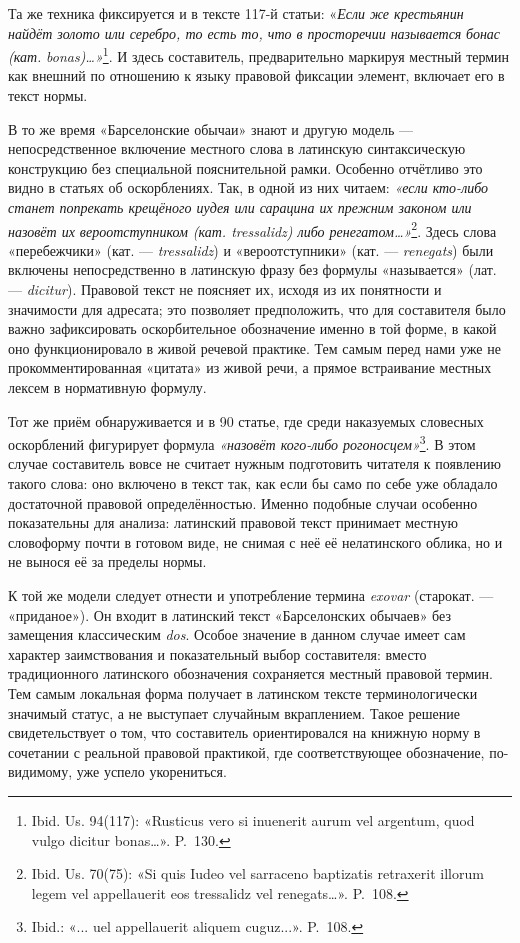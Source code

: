 Та же техника фиксируется и в тексте 117-й статьи: «\emph{Если же крестьянин найдёт золото или серебро, то есть то, что в просторечии называется }\emph{бонас (кат. }\emph{bonas}\emph{)}\emph{…»}\footnote{Ibid. Us. 94(117): «Rusticus vero si inuenerit aurum vel argentum, quod vulgo dicitur bonas…». P.~130.}. И здесь составитель, предварительно маркируя местный термин как внешний по отношению к языку правовой фиксации элемент, включает его в текст нормы.

В то же время «Барселонские обычаи» знают и другую модель --- непосредственное включение местного слова в латинскую синтаксическую конструкцию без специальной пояснительной рамки. Особенно отчётливо это видно в статьях об оскорблениях. Так, в одной из них читаем: \emph{«если кто-либо станет попрекать крещёного иудея или сарацина их прежним законом или назовёт их вероотступником (кат. tressalidz) либо ренегатом…»}\footnote{Ibid. Us. 70(75): «Si quis Iudeo vel sarraceno baptizatis retraxerit illorum legem vel appellauerit eos tressalidz vel renegats…». P.~108.}. Здесь слова «перебежчики» (кат. --- \emph{tressalidz}) и «вероотступники» (кат. --- \emph{renegats}) были включены непосредственно в латинскую фразу без формулы «называется» (лат. --- \emph{dicitur}). Правовой текст не поясняет их, исходя из их понятности и значимости для адресата; это позволяет предположить, что для составителя было важно зафиксировать оскорбительное обозначение именно в той форме, в какой оно функционировало в живой речевой практике. Тем самым перед нами уже не прокомментированная «цитата» из живой речи, а прямое встраивание местных лексем в нормативную формулу.

Тот же приём обнаруживается и в 90 статье, где среди наказуемых словесных оскорблений фигурирует формула \emph{«назовёт кого-либо рогоносцем»}\footnote{Ibid.: «... uel appellauerit aliquem cuguz...». P.~108.}. В этом случае составитель вовсе не считает нужным подготовить читателя к появлению такого слова: оно включено в текст так, как если бы само по себе уже обладало достаточной правовой определённостью. Именно подобные случаи особенно показательны для анализа: латинский правовой текст принимает местную словоформу почти в готовом виде, не снимая с неё её нелатинского облика, но и не вынося её за пределы нормы.

К той же модели следует отнести и употребление термина \emph{exovar} (старокат. --- «приданое»). Он входит в латинский текст «Барселонских обычаев» без замещения классическим \emph{dos}. Особое значение в данном случае имеет сам характер заимствования и показательный выбор составителя: вместо традиционного латинского обозначения сохраняется местный правовой термин. Тем самым локальная форма получает в латинском тексте терминологически значимый статус, а не выступает случайным вкраплением. Такое решение свидетельствует о том, что составитель ориентировался на книжную норму в сочетании с реальной правовой практикой, где соответствующее обозначение, по-видимому, уже успело укорениться.

